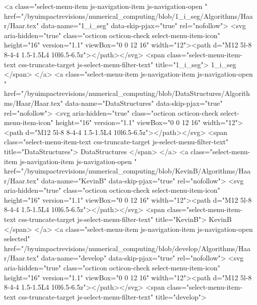             <a class="select-menu-item js-navigation-item js-navigation-open "
               href="/byuimpactrevisions/numerical_computing/blob/1_i_seg/Algorithms/Haar/Haar.tex"
               data-name="1_i_seg"
               data-skip-pjax="true"
               rel="nofollow">
              <svg aria-hidden="true" class="octicon octicon-check select-menu-item-icon" height="16" version="1.1" viewBox="0 0 12 16" width="12"><path d="M12 5l-8 8-4-4 1.5-1.5L4 10l6.5-6.5z"></path></svg>
              <span class="select-menu-item-text css-truncate-target js-select-menu-filter-text" title="1_i_seg">
                1_i_seg
              </span>
            </a>
            <a class="select-menu-item js-navigation-item js-navigation-open "
               href="/byuimpactrevisions/numerical_computing/blob/DataStructures/Algorithms/Haar/Haar.tex"
               data-name="DataStructures"
               data-skip-pjax="true"
               rel="nofollow">
              <svg aria-hidden="true" class="octicon octicon-check select-menu-item-icon" height="16" version="1.1" viewBox="0 0 12 16" width="12"><path d="M12 5l-8 8-4-4 1.5-1.5L4 10l6.5-6.5z"></path></svg>
              <span class="select-menu-item-text css-truncate-target js-select-menu-filter-text" title="DataStructures">
                DataStructures
              </span>
            </a>
            <a class="select-menu-item js-navigation-item js-navigation-open "
               href="/byuimpactrevisions/numerical_computing/blob/KevinB/Algorithms/Haar/Haar.tex"
               data-name="KevinB"
               data-skip-pjax="true"
               rel="nofollow">
              <svg aria-hidden="true" class="octicon octicon-check select-menu-item-icon" height="16" version="1.1" viewBox="0 0 12 16" width="12"><path d="M12 5l-8 8-4-4 1.5-1.5L4 10l6.5-6.5z"></path></svg>
              <span class="select-menu-item-text css-truncate-target js-select-menu-filter-text" title="KevinB">
                KevinB
              </span>
            </a>
            <a class="select-menu-item js-navigation-item js-navigation-open selected"
               href="/byuimpactrevisions/numerical_computing/blob/develop/Algorithms/Haar/Haar.tex"
               data-name="develop"
               data-skip-pjax="true"
               rel="nofollow">
              <svg aria-hidden="true" class="octicon octicon-check select-menu-item-icon" height="16" version="1.1" viewBox="0 0 12 16" width="12"><path d="M12 5l-8 8-4-4 1.5-1.5L4 10l6.5-6.5z"></path></svg>
              <span class="select-menu-item-text css-truncate-target js-select-menu-filter-text" title="develop">
